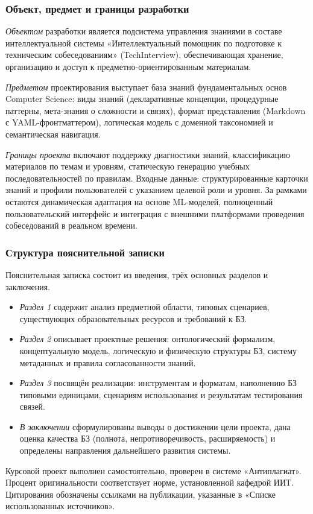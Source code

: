\subsubsection*{Объект, предмет и границы разработки}
    \textit{Объектом} разработки является подсистема управления знаниями в составе интеллектуальной системы «Интеллектуальный помощник по подготовке к техническим собеседованиям» (TechInterview), обеспечивающая хранение, организацию и доступ к предметно-ориентированным материалам.

    \textit{Предметом} проектирования выступает база знаний фундаментальных основ Computer Science: виды знаний (декларативные концепции, процедурные паттерны, мета-знания о сложности и связях), формат представления (Markdown с YAML-фронтматтером), логическая модель с доменной таксономией и семантическая навигация.

    \textit{Границы проекта} включают поддержку диагностики знаний, классификацию материалов по темам и уровням, статическую генерацию учебных последовательностей по правилам. Входные данные: структурированные карточки знаний и профили пользователей с указанием целевой роли и уровня. За рамками остаются динамическая адаптация на основе ML-моделей, полноценный пользовательский интерфейс и интеграция с внешними платформами проведения собеседований в реальном времени.

\subsubsection*{Структура пояснительной записки}
    Пояснительная записка состоит из введения, трёх основных разделов и заключения.

    \begin{itemize}
        \item \textit{Раздел 1} содержит анализ предметной области, типовых сценариев, существующих образовательных ресурсов и требований к БЗ.
        
        \item \textit{Раздел 2} описывает проектные решения: онтологический формализм, концептуальную модель, логическую и физическую структуры БЗ, систему метаданных и правила согласованности знаний.
        
        \item \textit{Раздел 3} посвящён реализации: инструментам и форматам, наполнению БЗ типовыми единицами, сценариям использования и результатам тестирования связей.
        
        \item \textit{В заключении} сформулированы выводы о достижении цели проекта, дана оценка качества БЗ (полнота, непротиворечивость, расширяемость) и определены направления дальнейшего развития системы.
    \end{itemize}

    Курсовой проект выполнен самостоятельно, проверен в системе «Антиплагиат». Процент оригинальности соответствует норме, установленной кафедрой ИИТ. Цитирования обозначены ссылками на публикации, указанные в «Списке использованных источников».